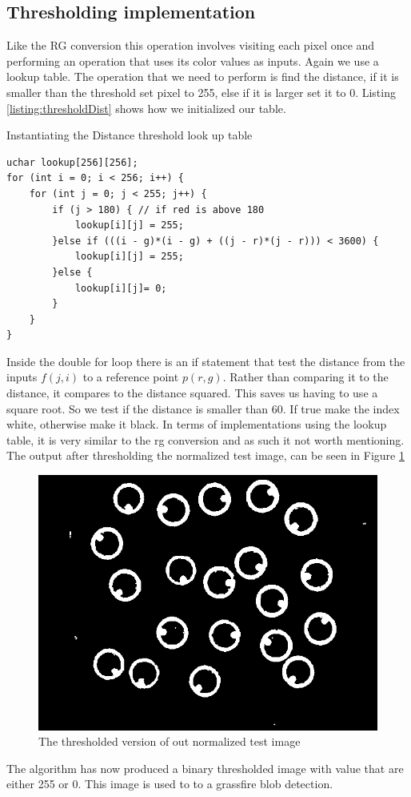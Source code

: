 \subsection{Thresholding implementation}
Like the RG conversion this operation involves visiting each pixel once and performing an operation that uses its color values as inputs. Again we use a lookup table. The operation that we need to perform is find the distance, if it is smaller than the threshold set pixel to 255, else if it is larger set it to 0. Listing \ref{listing:thresholdDist} shows how we initialized our table.
\begin{listing}[H]
	\caption{Instantiating the Distance threshold look up table}
	\label{listing:thresholdDist}
	\begin{verbatim}
uchar lookup[256][256];
for (int i = 0; i < 256; i++) {
	for (int j = 0; j < 255; j++) {
		if (j > 180) { // if red is above 180
			lookup[i][j] = 255;
		}else if (((i - g)*(i - g) + ((j - r)*(j - r))) < 3600) {
			lookup[i][j] = 255;
		}else {
			lookup[i][j]= 0;
		}
	}
}
\end{verbatim}
\end{listing}

Inside the double for loop there is an if statement that test the distance from the inputs $f(j,i)$ to a reference point $p(r,g)$. Rather than comparing it to the distance, it compares to the distance squared. This saves us having to use a square root. So we test if the distance is smaller than 60. If true make the index white, otherwise make it black. 
In terms of implementations using the lookup table, it is very similar to the rg conversion and as such it not worth mentioning. The output after thresholding the normalized test image, can be seen in Figure \ref{fig:thsnapshot}\\
\begin{figure}[H]
	\centering
	\includegraphics[width=0.6\linewidth]{figure/Analysis/thresholded.png}
	\caption{The thresholded version of out normalized test image}
	\label{fig:thsnapshot}
\end{figure} 
The algorithm has now produced a binary thresholded image with value that are either 255 or 0. This image is used to to a grassfire blob detection. 
